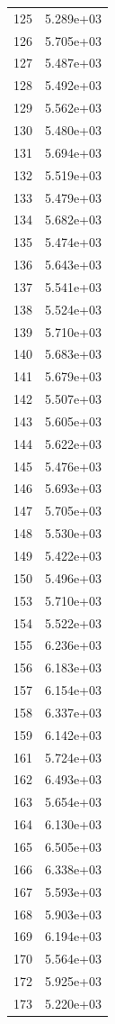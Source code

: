 \documentclass[12pt]{article}
\begin{document}
\begin{longtable}{@{}cc@{}}
125 & 5.289e+03 \\
126 & 5.705e+03 \\
127 & 5.487e+03 \\
128 & 5.492e+03 \\
129 & 5.562e+03 \\
130 & 5.480e+03 \\
131 & 5.694e+03 \\
132 & 5.519e+03 \\
133 & 5.479e+03 \\
134 & 5.682e+03 \\
135 & 5.474e+03 \\
136 & 5.643e+03 \\
137 & 5.541e+03 \\
138 & 5.524e+03 \\
139 & 5.710e+03 \\
140 & 5.683e+03 \\
141 & 5.679e+03 \\
142 & 5.507e+03 \\
143 & 5.605e+03 \\
144 & 5.622e+03 \\
145 & 5.476e+03 \\
146 & 5.693e+03 \\
147 & 5.705e+03 \\
148 & 5.530e+03 \\
149 & 5.422e+03 \\
150 & 5.496e+03 \\
153 & 5.710e+03 \\
154 & 5.522e+03 \\
155 & 6.236e+03 \\
156 & 6.183e+03 \\
157 & 6.154e+03 \\
158 & 6.337e+03 \\
159 & 6.142e+03 \\
161 & 5.724e+03 \\
162 & 6.493e+03 \\
163 & 5.654e+03 \\
164 & 6.130e+03 \\
165 & 6.505e+03 \\
166 & 6.338e+03 \\
167 & 5.593e+03 \\
168 & 5.903e+03 \\
169 & 6.194e+03 \\
170 & 5.564e+03 \\
172 & 5.925e+03 \\
173 & 5.220e+03 \\

\end{longtable}
\end{document}
